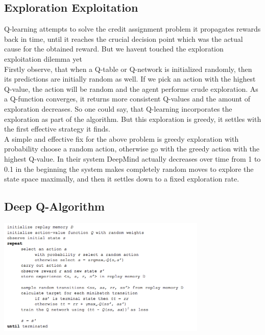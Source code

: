 \documentclass[twoside,letterpaper]{article}
\begin{document}
\subsection[Exploration Exploitation]{\rmfamily\bfseries\color{black}
Exploration Exploitation}
{\color{black}
Q-learning attempts to solve the credit assignment problem it propagates rewards back in time, until it reaches the crucial decision point which was the actual cause for the obtained reward. But we havent touched the exploration exploitation dilemma yet\\
\bigskip
Firstly observe, that when a Q-table or Q-network is initialized randomly, then its predictions are initially random as well. If we pick an action with the highest Q-value, the action will be random and the agent performs crude exploration. As a Q-function converges, it returns more consistent Q-values and the amount of exploration decreases. So one could say, that Q-learning incorporates the exploration as part of the algorithm. But this exploration is greedy, it settles with the first effective strategy it finds.\\
\bigskip
A simple and effective fix for the above problem is \textepsilon greedy exploration with probability \textepsilon choose a random action, otherwise go with the greedy action with the highest Q-value. In their system DeepMind actually decreases \textepsilon over time from 1 to 0.1 in the beginning the system makes completely random moves to explore the state space maximally, and then it settles down to a fixed exploration rate.\\
}

\subsection[Deep Q-Algorithm]{\rmfamily\bfseries\color{black}
Deep Q-Algorithm}

{\color{black}
\centering
\includegraphics[width=10cm]{images/deep3.png}\\}
\end{document}
